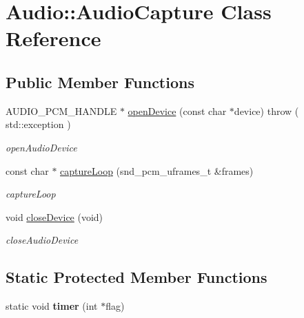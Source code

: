 \hypertarget{classAudio_1_1AudioCapture}{}\section{Audio\+:\+:Audio\+Capture Class Reference}
\label{classAudio_1_1AudioCapture}
\subsection*{Public Member Functions}
\begin{DoxyCompactItemize}
\item 
A\+U\+D\+I\+O\+\_\+\+P\+C\+M\+\_\+\+H\+A\+N\+D\+LE $\ast$ \hyperlink{classAudio_1_1AudioCapture_aa8bf234e7728124d90166950a178cc43}{open\+Device} (const char $\ast$device)  throw ( std\+::exception )
\begin{DoxyCompactList}\small\item\em open\+Audio\+Device \end{DoxyCompactList}\item 
const char $\ast$ \hyperlink{classAudio_1_1AudioCapture_af28ac994176fa3d13ac585200bd9c085}{capture\+Loop} (snd\+\_\+pcm\+\_\+uframes\+\_\+t \&frames)
\begin{DoxyCompactList}\small\item\em capture\+Loop \end{DoxyCompactList}\item 
\mbox{\label{classAudio_1_1AudioCapture_a5f79906da5c6680965032d4784a9a4a7}} 
void \hyperlink{classAudio_1_1AudioCapture_a5f79906da5c6680965032d4784a9a4a7}{close\+Device} (void)
\begin{DoxyCompactList}\small\item\em close\+Audio\+Device \end{DoxyCompactList}\end{DoxyCompactItemize}
\subsection*{Static Protected Member Functions}
\begin{DoxyCompactItemize}
\item 
\mbox{\label{classAudio_1_1AudioCapture_a42cd8df0ec987cda2cdeb448c7630495}} 
static void {\bfseries timer} (int $\ast$flag)
\end{DoxyCompactItemize}


